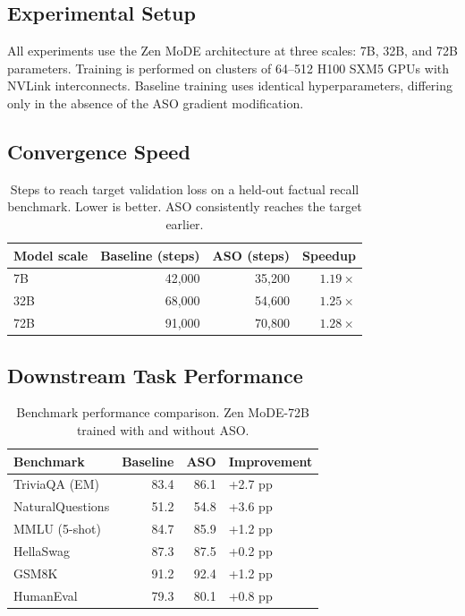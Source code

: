 \documentclass[11pt,a4paper]{article}
\begin{document}
\subsection{Experimental Setup}

All experiments use the Zen MoDE architecture at three scales: 7B, 32B, and 72B
parameters. Training is performed on clusters of 64--512 H100 SXM5 GPUs with NVLink
interconnects. Baseline training uses identical hyperparameters, differing only in the
absence of the ASO gradient modification.

\subsection{Convergence Speed}

\begin{table}[H]
\centering
\caption{Steps to reach target validation loss on a held-out factual recall benchmark.
Lower is better. ASO consistently reaches the target earlier.}
\begin{tabular}{lrrr}
\toprule
\textbf{Model scale} & \textbf{Baseline (steps)} & \textbf{ASO (steps)} & \textbf{Speedup} \\
\midrule
7B   & 42,000 & 35,200 & $1.19\times$ \\
32B  & 68,000 & 54,600 & $1.25\times$ \\
72B  & 91,000 & 70,800 & $1.28\times$ \\
\bottomrule
\end{tabular}
\label{tab:convergence}
\end{table}

\subsection{Downstream Task Performance}

\begin{table}[H]
\centering
\caption{Benchmark performance comparison. Zen MoDE-72B trained with and without ASO.}
\begin{tabular}{lrrl}
\toprule
\textbf{Benchmark} & \textbf{Baseline} & \textbf{ASO} & \textbf{Improvement} \\
\midrule
TriviaQA (EM)    & 83.4 & 86.1 & +2.7 pp \\
NaturalQuestions & 51.2 & 54.8 & +3.6 pp \\
MMLU (5-shot)    & 84.7 & 85.9 & +1.2 pp \\
HellaSwag        & 87.3 & 87.5 & +0.2 pp \\
GSM8K            & 91.2 & 92.4 & +1.2 pp \\
HumanEval        & 79.3 & 80.1 & +0.8 pp \\
\bottomrule
\end{tabular}
\label{tab:downstream}
\end{table}
\end{document}
